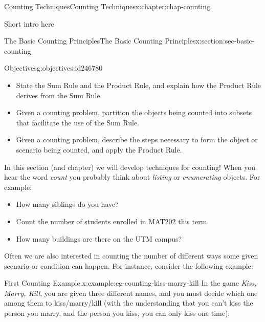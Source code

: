 \documentclass[oneside,10pt,]{book}
\numberwithin{equation}{section}
\begin{document}
%
%
\typeout{************************************************}
\typeout{************************************************}
%
\begin{chapterptx}{Counting Techniques}{}{Counting Techniques}{}{}{x:chapter:chap-counting}
\begin{introduction}{}%
Short intro here%
\end{introduction}%
%
%
\typeout{************************************************}
\typeout{************************************************}
%
\begin{sectionptx}{The Basic Counting Principles}{}{The Basic Counting Principles}{}{}{x:section:sec-basic-counting}
\begin{objectives}{Objectives}{g:objectives:id246780}
%
\begin{itemize}[label=\textbullet]
\item{}State the Sum Rule and the Product Rule, and explain how the Product Rule derives from the Sum Rule.%
\item{}Given a counting problem, partition the objects being counted into subsets that facilitate the use of the Sum Rule.%
\item{}Given a counting problem, describe the steps necessary to form the object or scenario being counted, and apply the Product Rule.%
\end{itemize}
\end{objectives}
In this section (and chapter) we will develop techniques for counting! When you hear the word \emph{count} you probably think about \emph{listing} or \emph{enumerating} objects. For example:%
\begin{itemize}[label=\textbullet]
\item{}How many siblings do you have?%
\item{}Count the number of students enrolled in MAT202 this term.%
\item{}How many buildings are there on the UTM campus?%
\end{itemize}
Often we are also interested in counting the number of different ways some given scenario or condition can happen. For instance, consider the following example:%
\begin{example}{First Counting Example.}{x:example:eg-counting-kiss-marry-kill}%
In the game \emph{Kiss, Marry, Kill},\footnotemark{} you are given three different names, and you must decide which one among them to kiss\slash{}marry\slash{}kill (with the understanding that you can't kiss the person you marry, and the person you kiss, you can only kiss one time).%

\end{example}
\end{sectionptx}
\end{chapterptx}
\end{document}
